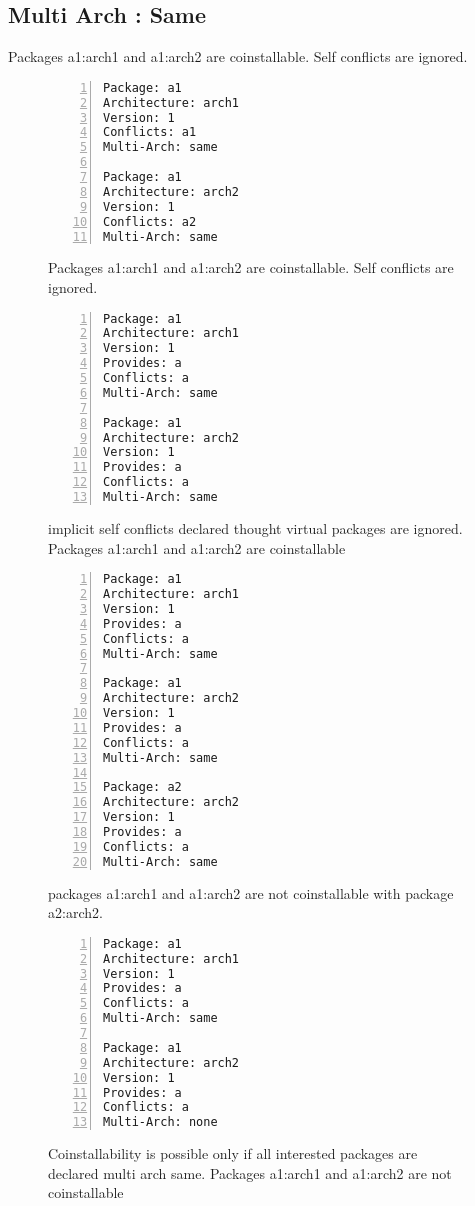 \subsection{Multi Arch : Same}

Packages a1:arch1 and a1:arch2 are coinstallable. Self conflicts are
ignored.

\begin{figure}
\begin{lstlisting}[style=debctrl,numbers=left,xleftmargin=20pt,basicstyle=\footnotesize\normalfont\ttfamily]
Package: a1
Architecture: arch1
Version: 1
Conflicts: a1
Multi-Arch: same

Package: a1
Architecture: arch2
Version: 1
Conflicts: a2
Multi-Arch: same
\end{lstlisting}
\caption{Packages a1:arch1 and a1:arch2 are coinstallable. Self
conflicts are ignored.}
\label{fig:arch-same-1}
\end{figure}

\begin{figure}
\begin{lstlisting}[style=debctrl,numbers=left,xleftmargin=20pt,basicstyle=\footnotesize\normalfont\ttfamily]
Package: a1
Architecture: arch1
Version: 1
Provides: a
Conflicts: a
Multi-Arch: same

Package: a1
Architecture: arch2
Version: 1
Provides: a
Conflicts: a
Multi-Arch: same
\end{lstlisting}
\caption{implicit self conflicts declared thought virtual packages are
ignored. Packages a1:arch1 and a1:arch2 are coinstallable}
\label{fig:arch-same-2}
\end{figure}

\begin{figure}
\begin{lstlisting}[style=debctrl,numbers=left,xleftmargin=20pt,basicstyle=\footnotesize\normalfont\ttfamily]
Package: a1
Architecture: arch1
Version: 1
Provides: a
Conflicts: a
Multi-Arch: same

Package: a1
Architecture: arch2
Version: 1
Provides: a
Conflicts: a
Multi-Arch: same

Package: a2
Architecture: arch2
Version: 1
Provides: a
Conflicts: a
Multi-Arch: same
\end{lstlisting}
\caption{packages a1:arch1 and a1:arch2 are not coinstallable with
package a2:arch2.}
\label{fig:arch-same-3}
\end{figure}

\begin{figure}
\begin{lstlisting}[style=debctrl,numbers=left,xleftmargin=20pt,basicstyle=\footnotesize\normalfont\ttfamily]
Package: a1
Architecture: arch1
Version: 1
Provides: a
Conflicts: a
Multi-Arch: same

Package: a1
Architecture: arch2
Version: 1
Provides: a
Conflicts: a
Multi-Arch: none
\end{lstlisting}
\caption{Coinstallability is possible only if all interested packages
are declared multi arch same.  Packages a1:arch1 and a1:arch2 are not
coinstallable}
\label{fig:arch-same-4}
\end{figure}


